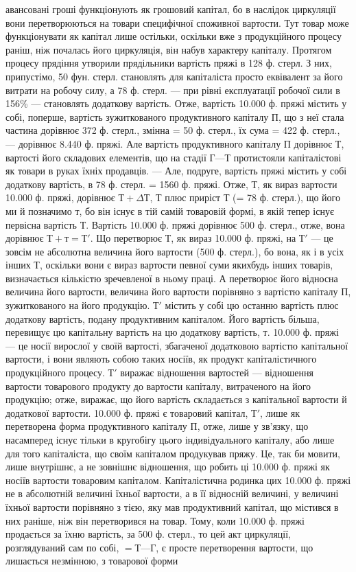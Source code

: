 \parcont{}  %
авансовані гроші функціонують як грошовий капітал, бо в наслідок
циркуляції вони перетворюються на товари специфічної споживної
вартости. Тут товар може функціонувати як капітал лише остільки,
оскільки вже з продукційного процесу раніш, ніж почалась його циркуляція,
він набув характеру капіталу. Протягом процесу прядіння утворили
прядільники вартість пряжі в 128 ф. стерл. З них, припустімо, 50 фун.
стерл. становлять для капіталіста просто еквівалент за його витрати на
робочу силу, а 78 ф. стерл. — при рівні експлуатації робочої сили в 156\%
— становлять додаткову вартість. Отже, вартість 10.000 ф. пряжі містить у
собі, поперше, вартість зужиткованого продуктивного капіталу П, що з неї
стала частина дорівнює 372 ф. стерл., змінна = 50 ф. стерл., їх
сума = 422 ф. стерл., — дорівнює 8.440 ф. пряжі. Але вартість
продуктивного капіталу П дорівнює Т, вартості його складових елементів,
що на стадії $Г — Т$ протистояли капіталістові як товари в руках їхніх
продавців. — Але, подруге, вартість пряжі містить у собі додаткову вартість,
в 78 ф. стерл. = 1560 ф. пряжі. Отже, $Т$, як вираз вартости 10.000 ф.
пряжі, дорівнює $Т + ΔТ$, $Т$ плюс приріст $Т$ (= 78 ф. стерл.), що його ми й
позначимо $т$, бо він існує в тій самій товаровій формі, в якій тепер існує
первісна вартість $Т$. Вартість 10.000 ф. пряжі дорівнює 500 ф. стерл., отже,
вона дорівнює $Т + т = Т'$. Що перетворює $Т$, як вираз 10.000 ф. пряжі, на
$Т'$ — це зовсім не абсолютна величина його вартости (500 ф. стерл.), бо вона,
як і в усіх інших $Т$, оскільки вони є вираз вартости певної суми якихбудь
інших товарів, визначається кількістю зречевленої в ньому праці.
А перетворює його відносна величина його вартости, величина його
вартости порівняно з вартістю капіталу $П$, зужиткованого на його
продукцію. $Т'$ містить у собі цю останню вартість плюс додаткову
вартість, подану продуктивним капіталом. Його вартість більша, перевищує
цю капітальну вартість на цю додаткову вартість, $т$. 10.000 ф.
пряжі — це носії вирослої у своїй вартості, збагаченої додатковою вартістю
капітальної вартости, і вони являють собою таких носіїв, як
продукт капіталістичного продукційного процесу. $Т'$ виражає відношення
вартостей — відношення вартости товарового продукту до
вартости капіталу, витраченого на його продукцію; отже, виражає, що
його вартість складається з капітальної вартости й додаткової вартости.
10.000 ф. пряжі є товаровий капітал, $Т'$, лише як перетворена форма
продуктивного капіталу $П$, отже, лише у зв’язку, що насамперед існує
тільки в кругобігу цього індивідуального капіталу, або лише для того
капіталіста, що своїм капіталом продукував пряжу. Це, так би мовити,
лише внутрішнє, а не зовнішнє відношення, що робить ці 10.000 ф.
пряжі як носіїв вартости товаровим капіталом. Капіталістична родинка
цих 10.000 ф. пряжі не в абсолютній величині їхньої вартости, а в її відносній
величині, у величині їхньої вартости порівняно з тією, яку мав
продуктивний капітал, що містився в них раніше, ніж він перетворився
на товар. Тому, коли 10.000 ф. пряжі продається за їхню вартість, за
500 ф. стерл., то цей акт циркуляції, розглядуваний сам по собі, $= Т — Г$,
є просте перетворення вартости, що лишається незмінною, з товарової форми
\parbreak{}  %
